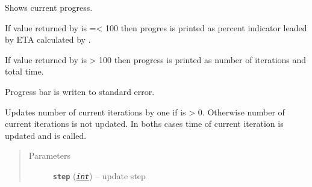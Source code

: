 \documentclass[a4paper,10pt,english]{sphinxmanual}
\begin{document}
\begin{fulllineitems}
\begin{fulllineitems}
\begin{quote}
\begin{description}
\end{description}\end{quote}

\end{fulllineitems}


\begin{fulllineitems}
\label{aqueduct.utils.clui:aqueduct.utils.clui.SimpleProgressBar.show}
Shows current progress.

If value returned by {\hyperref[aqueduct.utils.clui:aqueduct.utils.clui.SimpleProgressBar.percent]{}} is =\textless{} 100 then progres is printed as
percent indicator leaded by ETA calculated by {\hyperref[aqueduct.utils.clui:aqueduct.utils.clui.SimpleProgressBar.ETA]{}}.

If value returned by {\hyperref[aqueduct.utils.clui:aqueduct.utils.clui.SimpleProgressBar.percent]{}} is \textgreater{} 100 then progress is printed as
number of iterations and total time.

Progress bar is writen to standard error.

\end{fulllineitems}


\begin{fulllineitems}
\label{aqueduct.utils.clui:aqueduct.utils.clui.SimpleProgressBar.heartbeat}
\end{fulllineitems}


\begin{fulllineitems}
\label{aqueduct.utils.clui:aqueduct.utils.clui.SimpleProgressBar.update}
Updates number of current iterations  by one if  is \textgreater{} 0.
Otherwise number of current iterations is not updated.
In boths cases time of current iteration  is updated and
{\hyperref[aqueduct.utils.clui:aqueduct.utils.clui.SimpleProgressBar.show]{}} is called.
\begin{quote}\begin{description}
\item[{Parameters}] \leavevmode
\textbf{\texttt{step}} (\href{https://docs.python.org/2/library/functions.html\#int}{\emph{\texttt{int}}}) -- update step


\end{description}
\end{quote}
\end{fulllineitems}
\end{fulllineitems}
\end{document}
